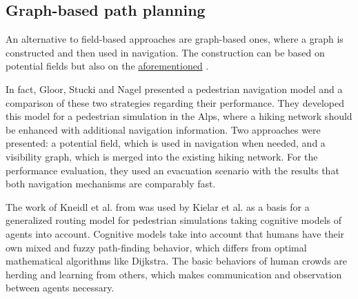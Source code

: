 	\subsection{Graph-based path planning}
	
		An alternative to field-based approaches are graph-based ones, where a graph is constructed and then used in navigation.
		The construction can be based on potential fields but also on the \hyperref[subsec:related-work:visibility-graph]{aforementioned} .
		
		In fact, Gloor, Stucki and Nagel presented a pedestrian navigation model and a comparison of these two strategies regarding their performance\cite{gloor-hybrid-pedestrian-routing}.
		They developed this model for a pedestrian simulation in the Alps, where a hiking network should be enhanced with additional navigation information.
		Two approaches were presented:
		a potential field, which is used in navigation when needed, and a visibility graph, which is merged into the existing hiking network.
		For the performance evaluation, they used an evacuation scenario with the results that both navigation mechanisms are comparably fast.
		
		The work of Kneidl et al. from  was used by Kielar et al. as a basis for a generalized routing model for pedestrian simulations\cite{kielar-unified-pedestrian-routing} taking cognitive models of agents into account.
		Cognitive models take into account that humans have their own mixed and fuzzy path-finding behavior, which differs from optimal mathematical algorithms like Dijkstra.
		The basic behaviors of human crowds are herding and learning from others, which makes communication and observation between agents necessary.